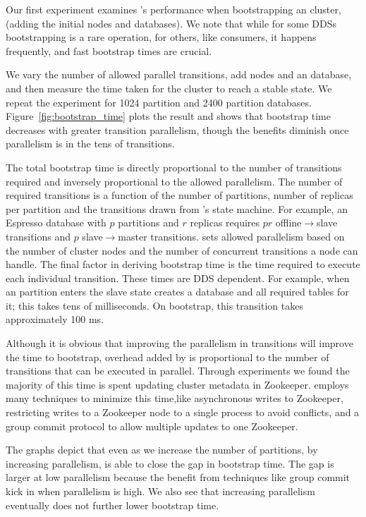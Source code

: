 Our first experiment examines \helix's performance when bootstrapping an \ES cluster,
(\ie adding the initial nodes and databases).  We note that while for some DDSs
bootstrapping is a rare operation, for others, like \databus consumers, it
happens frequently, and fast bootstrap times are crucial.

We vary the number of allowed parallel transitions, add nodes and an \ES
database, and then measure the time taken for the cluster to reach a stable
state.  We repeat the experiment for 1024 partition and 2400 partition
databases. 
Figure~\ref{fig:bootstrap_time} plots the result and shows that bootstrap time
decreases with greater transition parallelism, though the benefits diminish once
parallelism is in the tens of transitions.

The total bootstrap time is directly proportional to the number of transitions
required and inversely proportional to the allowed parallelism.  The number of
required transitions is a function of the number of partitions, number of
replicas per partition and the transitions drawn from \ES's state machine.
For example, an Espresso database with $p$ partitions and $r$ replicas requires
$pr$ offline$\rightarrow$slave transitions and $p$ slave$\rightarrow$master
transitions.  \ES sets allowed parallelism based on the number of cluster nodes
and the number of concurrent transitions a node can handle.
The final factor in deriving bootstrap time is the time required to execute each
individual transition.  These times are DDS dependent. 
For example, when an \ES partition enters the slave state \ES creates a \mysql
database and all required tables for it; this takes tens of milliseconds.
On bootstrap, this transition takes approximately 100 ms.  

Although it is obvious that improving the parallelism in transitions will
improve the time to bootstrap, overhead added by \helix is proportional to the
number of transitions that can be executed in parallel. Through experiments we
found the majority of this time is spent updating cluster metadata in
Zookeeper. \helix employs many techniques to minimize this time,like asynchronous 
writes to Zookeeper, restricting writes to a Zookeeper node to a single process to avoid
conflicts, and a group commit protocol to allow multiple updates to one
Zookeeper.

The graphs depict that even as we increase the number of partitions, by
increasing parallelism, \helix is able to close the gap in
bootstrap time. The gap is larger at low parallelism because the benefit from techniques like
group commit kick in when parallelism is high. We also see that increasing
parallelism eventually does not further lower bootstrap time.

